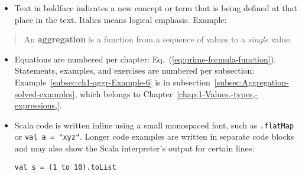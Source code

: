 \begin{itemize}
\item Text in boldface indicates a new concept or term that is being defined
at that place in the text. Italics means logical emphasis. Example:
\end{itemize}
\begin{quotation}
An \textbf{aggregation} is a function from a sequence
of values to a \emph{single} value.
\end{quotation}
\begin{itemize}
\item Equations are numbered per chapter: Eq.~(\ref{eq:prime-formula-function}).
Statements, examples, and exercises are numbered per subsection: Example~\ref{subsec:ch1-aggr-Example-6}
is in subsection~\ref{subsec:Aggregation-solved-examples}, which
belongs to Chapter~\ref{chap:1-Values,-types,-expressions,}.
\item Scala code is written inline using a small monospaced font, such as
\lstinline!.flatMap! or \lstinline!val a = "xyz"!. Longer code examples
are written in separate code blocks and may also show the Scala interpreter's
output for certain lines:
\begin{lstlisting}[mathescape=true]
val s = (1 to 10).toList


\end{lstlisting}
\end{itemize}
